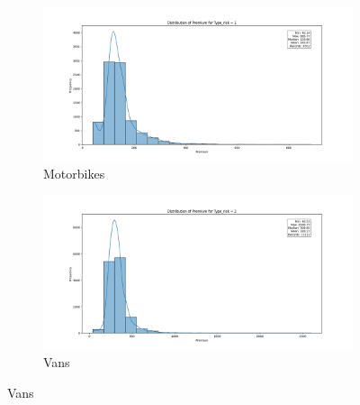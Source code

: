 \documentclass{article}
\begin{document}
\begin{figure}[H]
    \centering
    \begin{subfigure}{.5\textwidth}
        \centering
        \includegraphics[width=.8\linewidth]{images/premium_risk1.png} %
        \caption{Motorbikes}
    \end{subfigure}%
    \begin{subfigure}{.5\textwidth}
        \centering
        \includegraphics[width=.8\linewidth]{images/premium_risk2.png} %
        \caption{Vans}
    \end{subfigure}
   
    \label{fig:test}
\end{figure}
	
\end{document}
